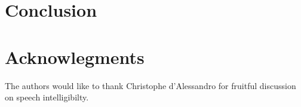 \documentclass[final,3p,times,twocolumn]{elsarticle}
\begin{document}
\section{Conclusion}

\section{Acknowlegments}

The authors would like to thank Christophe d'Alessandro for fruitful discussion on speech intelligibilty.

\clearpage






\end{document}
